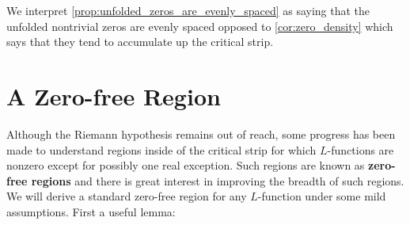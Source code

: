     We interpret \cref{prop:unfolded_zeros_are_evenly_spaced} as saying that the unfolded nontrivial zeros are evenly spaced opposed to \cref{cor:zero_density} which says that they tend to accumulate up the critical strip.
  \section{A Zero-free Region}
    Although the Riemann hypothesis remains out of reach, some progress has been made to understand regions inside of the critical strip for which $L$-functions are nonzero except for possibly one real exception. Such regions are known as \textbf{zero-free regions} and there is great interest in improving the breadth of such regions. We will derive a standard zero-free region for any $L$-function under some mild assumptions. First a useful lemma:


